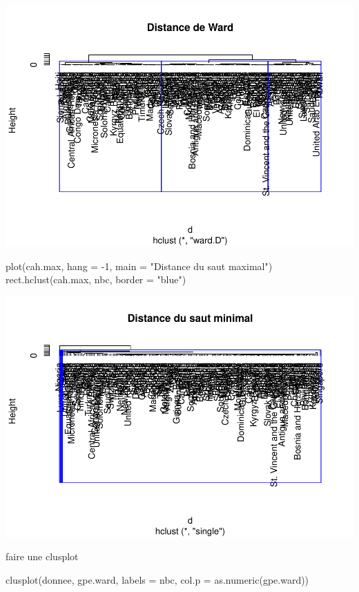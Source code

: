 \documentclass[
]{article}
\newenvironment{Shaded}{}{}
\newcommand{\AttributeTok}[1]{#1}
\newcommand{\DecValTok}[1]{#1}
\newcommand{\FunctionTok}[1]{#1}
\newcommand{\NormalTok}[1]{#1}
\newcommand{\SpecialCharTok}[1]{\textcolor[rgb]{0.00,0.50,0.50}{#1}}
\newcommand{\StringTok}[1]{\textcolor[rgb]{0.00,0.50,0.50}{#1}}
\begin{document}
\includegraphics{projet_classification_files/figure-latex/unnamed-chunk-21-1.pdf}

\begin{Shaded}
\begin{Highlighting}[]
\FunctionTok{plot}\NormalTok{(cah.max, }\AttributeTok{hang =} \SpecialCharTok{{-}}\DecValTok{1}\NormalTok{, }\AttributeTok{main =} \StringTok{"Distance du saut maximal"}\NormalTok{)}
\FunctionTok{rect.hclust}\NormalTok{(cah.max, nbc, }\AttributeTok{border =} \StringTok{"blue"}\NormalTok{)}
\end{Highlighting}
\end{Shaded}

\includegraphics{projet_classification_files/figure-latex/unnamed-chunk-22-1.pdf}

faire une clusplot

\begin{Shaded}
\begin{Highlighting}[]
\FunctionTok{clusplot}\NormalTok{(donnee, gpe.ward, }\AttributeTok{labels =}\NormalTok{ nbc, }\AttributeTok{col.p =} \FunctionTok{as.numeric}\NormalTok{(gpe.ward))}
\end{Highlighting}
\end{Shaded}
\end{document}
